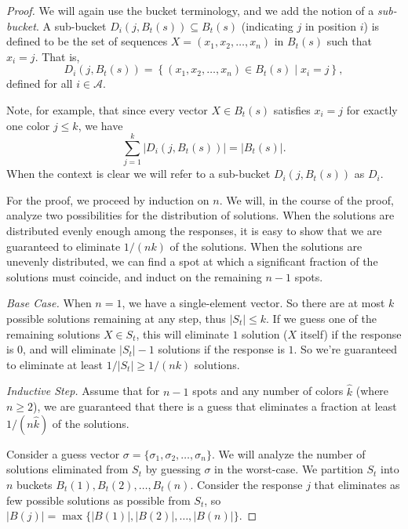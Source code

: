 \documentclass[12pt, a4paper]{article}
\begin{document}
\begin{proof}
	We will again use the bucket terminology, and we add the notion of a \textit{sub-bucket}. A sub-bucket $D_i(j, B_t(s))\subseteq B_t(s)$ (indicating $j$ in position $i$) is defined to be the set of sequences $X = (x_1, x_2, \ldots, x_n)$ in $B_t(s)$ such that $x_i = j$. That is,
	\begin{equation*}
		D_i(j, B_t(s)) = \left\{(x_1, x_2, \ldots, x_n)\in B_t(s)\mid x_i = j\right\},
	\end{equation*}
	defined for all $i\in\mathcal{A}$. 
	
	Note, for example, that since every vector $X \in B_t(s)$ satisfies $x_i = j$ for exactly one color $j \leq k$, we have
	\begin{equation}\label{color-buck}
	\sum_{j = 1}^k |D_i(j,B_t(s))| = |B_t(s)|.
	\end{equation}
	When the context is clear we will refer to a sub-bucket $D_i(j, B_t(s))$ as $D_i$.
	
	For the proof, we proceed by induction on $n$. We will, in the course of the proof, analyze two possibilities for the distribution of solutions. When the solutions are distributed evenly enough among the responses, it is easy to show that we are guaranteed to eliminate $1/(nk)$ of the solutions. When the solutions are unevenly distributed, we can find a spot at which a significant fraction of the solutions must coincide, and induct on the remaining $n-1$ spots.
	
	\textit{Base Case.} When $n=1$, we have a single-element vector. So there are at most $k$ possible solutions remaining at any step, thus $|S_t|\le k$. If we guess one of the remaining solutions $X\in S_t$, this will eliminate $1$ solution ($X$ itself) if the response is $0$, and will eliminate $|S_t|-1$ solutions if the response is $1$. So we're guaranteed to eliminate at least $1/|S_t|\ge 1/(nk)$ solutions.
		
	\textit{Inductive Step.} Assume that for $n-1$ spots and any number of colors $\widehat{k}$ (where $n\ge 2$), we are guaranteed that there is a guess that eliminates a fraction at least $1/(n\widehat{k})$ of the solutions.
		
	Consider a guess vector $\sigma=\{\sigma_1, \sigma_2, \ldots, \sigma_n\}$. We will analyze the number of solutions eliminated from $S_t$ by guessing $\sigma$ in the worst-case. We partition $S_t$ into $n$ buckets $B_t(1), B_t(2), \ldots, B_t(n)$. Consider the response $j$ that eliminates as few possible solutions as possible from $S_t$, so $|B(j)| = \max\{|B(1)|, |B(2)|, \ldots, |B(n)|\}$. 
	

\end{proof}
\end{document}
